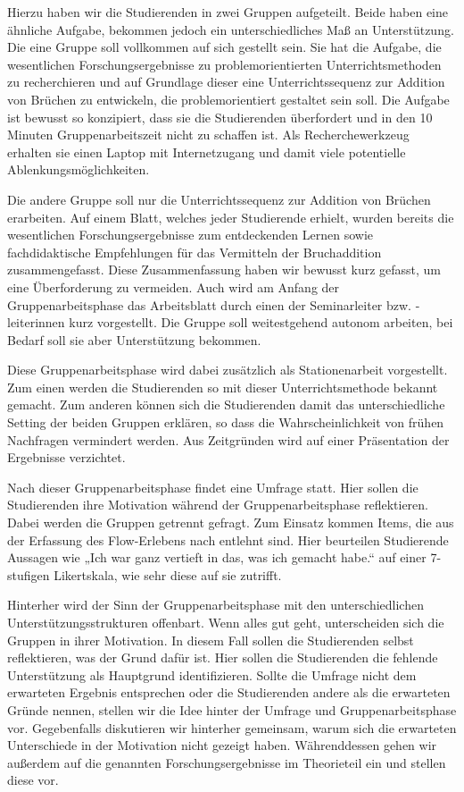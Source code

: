 \documentclass[man,12pt,a4paper]{apa6}
\begin{document}
Hierzu haben wir die Studierenden in zwei Gruppen aufgeteilt. Beide haben eine ähnliche Aufgabe, bekommen jedoch ein unterschiedliches Maß an Unterstützung. Die eine Gruppe soll vollkommen auf sich gestellt sein. Sie hat die Aufgabe, die wesentlichen Forschungsergebnisse zu problemorientierten Unterrichtsmethoden zu recherchieren und auf Grundlage dieser eine Unterrichtssequenz zur Addition von Brüchen zu entwickeln, die problemorientiert gestaltet sein soll. Die Aufgabe ist bewusst so konzipiert, dass sie die Studierenden überfordert und in den 10 Minuten Gruppenarbeitszeit nicht zu schaffen ist. Als Recherchewerkzeug erhalten sie einen Laptop mit Internetzugang und damit viele potentielle Ablenkungsmöglichkeiten.

Die andere Gruppe soll nur die Unterrichtssequenz zur Addition von Brüchen erarbeiten. Auf einem Blatt, welches jeder Studierende erhielt, wurden bereits die wesentlichen Forschungsergebnisse zum entdeckenden Lernen sowie fachdidaktische Empfehlungen für das Vermitteln der Bruchaddition zusammengefasst. Diese Zusammenfassung haben wir bewusst kurz gefasst, um eine Überforderung zu vermeiden. Auch wird am Anfang der Gruppenarbeitsphase das Arbeitsblatt durch einen der Seminarleiter bzw. -leiterinnen kurz vorgestellt. Die Gruppe soll weitestgehend autonom arbeiten, bei Bedarf soll sie aber Unterstützung bekommen.

Diese Gruppenarbeitsphase wird dabei zusätzlich als Stationenarbeit vorgestellt. Zum einen werden die Studierenden so mit dieser Unterrichtsmethode bekannt gemacht. Zum anderen können sich die Studierenden damit das unterschiedliche Setting der beiden Gruppen erklären, so dass die Wahrscheinlichkeit von frühen Nachfragen vermindert werden. Aus Zeitgründen wird auf einer Präsentation der Ergebnisse verzichtet.

Nach dieser Gruppenarbeitsphase findet eine Umfrage statt. Hier sollen die Studierenden ihre Motivation während der Gruppenarbeitsphase reflektieren. Dabei werden die Gruppen getrennt gefragt. Zum Einsatz kommen Items, die aus der Erfassung des Flow-Erlebens nach \textcite{fks} entlehnt sind. Hier beurteilen Studierende Aussagen wie „Ich war ganz vertieft in das, was ich gemacht habe.“ auf einer 7-stufigen Likertskala, wie sehr diese auf sie zutrifft.

Hinterher wird der Sinn der Gruppenarbeitsphase mit den unterschiedlichen Unterstützungsstrukturen offenbart. Wenn alles gut geht, unterscheiden sich die Gruppen in ihrer Motivation. In diesem Fall sollen die Studierenden selbst reflektieren, was der Grund dafür ist. Hier sollen die Studierenden die fehlende Unterstützung als Hauptgrund identifizieren. Sollte die Umfrage nicht dem erwarteten Ergebnis entsprechen oder die Studierenden andere als die erwarteten Gründe nennen, stellen wir die Idee hinter der Umfrage und Gruppenarbeitsphase vor. Gegebenfalls diskutieren wir hinterher gemeinsam, warum sich die erwarteten Unterschiede in der Motivation nicht gezeigt haben. Währenddessen gehen wir außerdem auf die genannten Forschungsergebnisse im Theorieteil ein und stellen diese vor.
\end{document}
